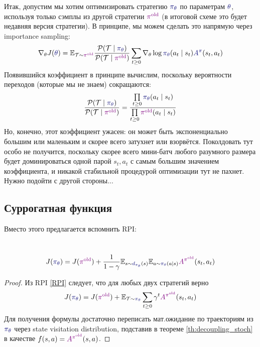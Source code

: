Итак, допустим мы хотим оптимизировать стратегию $\textcolor{ChadBlue}{\pi_\theta}$ по параметрам $\textcolor{ChadBlue}{\theta}$, используя только сэмплы из другой стратегии $\textcolor{ChadPurple}{\pi^{\old}}$ (в итоговой схеме это будет недавняя версия стратегии). В принципе, мы можем сделать это напрямую через importance sampling:
$$
\nabla_{\theta} J(\textcolor{ChadBlue}{\theta}) = \E_{\Traj \sim \textcolor{ChadPurple}{\pi^{\old}}} \frac{\mathcal{P}(\Traj \mid \textcolor{ChadBlue}{\pi_{\theta}})}{\mathcal{P}(\Traj \mid \textcolor{ChadPurple}{\pi^{\old}})} \sum_{t \ge 0} \nabla_{\theta} \log \textcolor{ChadBlue}{\pi_{\theta}}(a_t \mid s_t) \textcolor{ChadBlue}{A^\pi}(s_t, a_t)
$$
Появившийся коэффициент в принципе вычислим, поскольку вероятности переходов (которые мы не знаем) сокращаются:
$$\frac{\mathcal{P}(\Traj \mid \textcolor{ChadBlue}{\pi_\theta})}{\mathcal{P}(\Traj \mid \textcolor{ChadPurple}{\pi^{\old}})} = \frac{\prod\limits_{t \ge 0} \textcolor{ChadBlue}{\pi_\theta}(a_t \mid s_t)}{\prod\limits_{t \ge 0} \textcolor{ChadPurple}{\pi^{\old}}(a_t \mid s_t)}$$
Но, конечно, этот коэффициент ужасен: он может быть экспоненциально большим или маленьким и скорее всего затухнет или взорвётся. Поколдовать тут особо не получится, поскольку скорее всего мини-батч любого разумного размера будет доминироваться одной парой $s_t, a_t$ с самым большим значением коэффициента, и никакой стабильной процедурой оптимизации тут не пахнет. Нужно подойти с другой стороны...

\subsection{Суррогатная функция}

Вместо этого предлагается вспомнить RPI:
\begin{theorem}
\,
\begin{equation}\label{RPIdecoupled}
J(\textcolor{ChadBlue}{\pi_{\theta}}) = J(\textcolor{ChadPurple}{\pi^{\old}}) + \frac{1}{1 - \gamma}\E_{s \sim \textcolor{ChadBlue}{d_{\pi_{\theta}}}(s)} \E_{a \sim \textcolor{ChadBlue}{\pi_{\theta}}(a \mid s)} \textcolor{ChadPurple}{A^{\pi^{\old}}}(s_t, a_t)
\end{equation}
\begin{proof}
Из RPI \eqref{RPI} следует, что для любых двух стратегий верно 
$$J(\textcolor{ChadBlue}{\pi_{\theta}}) = J(\textcolor{ChadPurple}{\pi^{\old}}) + \E_{\Traj \sim \textcolor{ChadBlue}{\pi_{\theta}}} \sum_{t \ge 0} \gamma^t \textcolor{ChadPurple}{A^{\pi^{\old}}}(s_t, a_t)$$
Для получения формулы достаточно переписать мат.ожидание по траекториям из $\textcolor{ChadBlue}{\pi_{\theta}}$ через state visitation distribution, подставив в теореме \ref{th:decoupling_stoch} в качестве $f(s, a) \HM= \textcolor{ChadPurple}{A^{\pi^{\old}}}(s, a)$.
\end{proof}
\end{theorem}

